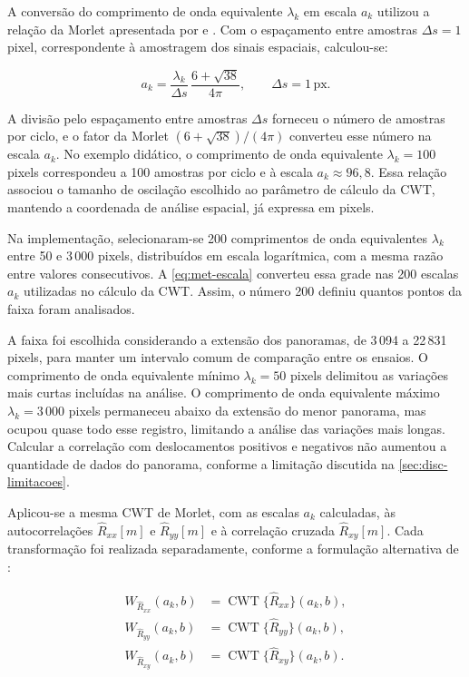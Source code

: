 A conversão do comprimento de onda equivalente $\lambda_k$ em escala $a_k$
utilizou a relação da Morlet apresentada por  e
. Com o espaçamento entre amostras $\Delta s=1$ pixel,
correspondente à amostragem dos sinais espaciais, calculou-se:
\nopagebreak[4]

\begin{equation}\label{eq:met-escala}
  a_k=\frac{\lambda_k}{\Delta s}\,\frac{6+\sqrt{38}}{4\pi},
  \qquad \Delta s=1\,\mathrm{px}.
\end{equation}

\noindent
A divisão pelo espaçamento entre amostras $\Delta s$ forneceu o número de
amostras por ciclo, e o fator da Morlet $(6+\sqrt{38})/(4\pi)$ converteu
esse número na escala $a_k$. No exemplo didático, o comprimento de onda
equivalente $\lambda_k=100$ pixels correspondeu a 100 amostras por ciclo
e à escala $a_k\approx96{,}8$. Essa relação associou o tamanho de oscilação
escolhido ao parâmetro de cálculo da CWT, mantendo a coordenada de análise
espacial, já expressa em pixels.

Na implementação, selecionaram-se 200 comprimentos de onda equivalentes
$\lambda_k$ entre 50 e 3\,000 pixels, distribuídos em escala logarítmica,
com a mesma razão entre valores consecutivos. A \autoref{eq:met-escala}
converteu essa grade nas 200 escalas $a_k$ utilizadas no cálculo da CWT.
Assim, o número 200 definiu quantos pontos da faixa foram analisados.

A faixa foi escolhida considerando a extensão dos panoramas, de 3\,094 a
22\,831 pixels, para manter um intervalo comum de comparação entre os ensaios.
O comprimento de onda equivalente mínimo $\lambda_k=50$ pixels delimitou
as variações mais curtas incluídas na análise. O comprimento de onda
equivalente máximo $\lambda_k=3\,000$ pixels permaneceu abaixo da extensão
do menor panorama, mas ocupou quase todo esse registro, limitando a análise
das variações mais longas. Calcular a correlação com deslocamentos positivos
e negativos não aumentou a quantidade de dados do panorama, conforme a
limitação discutida na \autoref{sec:disc-limitacoes}.

Aplicou-se a mesma CWT de Morlet, com as escalas $a_k$ calculadas, às
autocorrelações $\widehat R_{xx}[m]$ e $\widehat R_{yy}[m]$ e à correlação
cruzada $\widehat R_{xy}[m]$. Cada transformação foi realizada separadamente,
conforme a formulação alternativa de :
\nopagebreak[4]

\begin{equation}\label{eq:met-cwt-correlacoes}
  \begin{aligned}
    W_{\widehat R_{xx}}(a_k,b)
      &=\operatorname{CWT}\{\widehat R_{xx}\}(a_k,b),\\
    W_{\widehat R_{yy}}(a_k,b)
      &=\operatorname{CWT}\{\widehat R_{yy}\}(a_k,b),\\
    W_{\widehat R_{xy}}(a_k,b)
      &=\operatorname{CWT}\{\widehat R_{xy}\}(a_k,b).
  \end{aligned}
\end{equation}

